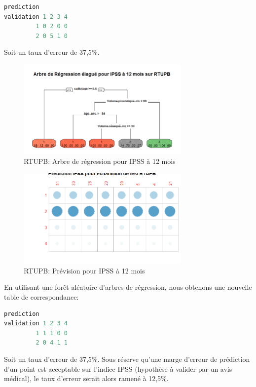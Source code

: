 \begin{lstlisting}[language=R]
          prediction
validation 1 2 3 4
         1 0 2 0 0
         2 0 5 1 0
\end{lstlisting}
Soit un taux d'erreur de 37,5\%.

\begin{figure}[H]
\centering
\includegraphics[width=0.75\textwidth]{../Fig/RTUPB/rtupb-regtree-ipss12.png}
\caption{RTUPB: Arbre de régression pour IPSS à 12 mois}
\label{fig-rtupb-regtree-ipss12}
\end{figure}


\begin{figure}[H]
\centering
\includegraphics[width=0.75\textwidth]{../Fig/RTUPB/rtupb-regtree-predict-ipss12.png}
\caption{RTUPB: Prévision pour IPSS à 12 mois}
\label{fig-rtupb-regtree-predict-ipss12}
\end{figure}

En utilisant une forêt aléatoire d'arbres de régression, nous obtenons une nouvelle table de correspondance:
\begin{lstlisting}[language=R]
           prediction
validation 1 2 3 4
         1 1 1 0 0
         2 0 4 1 1
\end{lstlisting}
Soit un taux d'erreur de 37,5\%. Sous réserve qu'une marge d'erreur de prédiction d'un point est acceptable sur l'indice IPSS (hypothèse à valider par un avis médical), le taux d'erreur serait alors ramené à 12,5\%.

